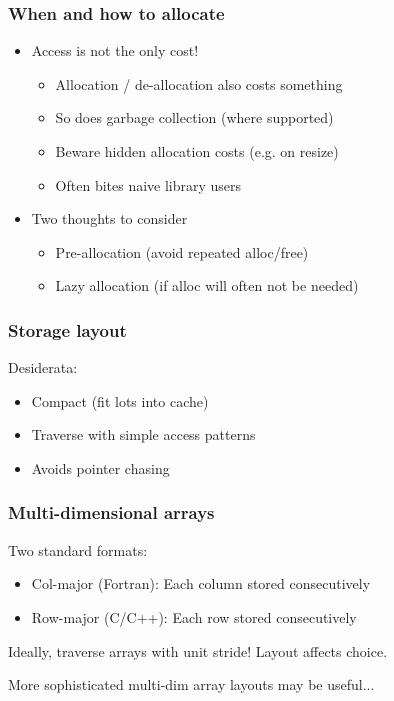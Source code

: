 \documentclass{beamer}
\begin{document}
\begin{frame}
  \frametitle{When and how to allocate}

  \begin{itemize}
  \item Access is not the only cost!
    \begin{itemize}
    \item Allocation / de-allocation also costs something
    \item So does garbage collection (where supported)
    \item Beware hidden allocation costs (e.g. on resize)
    \item Often bites naive library users
    \end{itemize}
  \item Two thoughts to consider
    \begin{itemize}
    \item Pre-allocation (avoid repeated alloc/free)
    \item Lazy allocation (if alloc will often not be needed)
    \end{itemize}
  \end{itemize}
\end{frame}


\begin{frame}
  \frametitle{Storage layout}

  Desiderata:
  \begin{itemize}
  \item Compact (fit lots into cache)
  \item Traverse with simple access patterns
  \item Avoids pointer chasing
  \end{itemize}
\end{frame}


\begin{frame}
  \frametitle{Multi-dimensional arrays}

  Two standard formats:
  \begin{itemize}
  \item Col-major (Fortran): Each column stored consecutively
  \item Row-major (C/C++): Each row stored consecutively
  \end{itemize}
  Ideally, traverse arrays with unit stride!  Layout affects choice.

  \vspace{1cm}
  More sophisticated multi-dim array layouts may be useful...
\end{frame}
\end{document}
